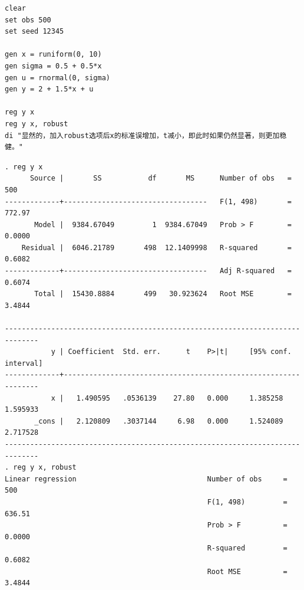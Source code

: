 \begin{tcolorbox}[title=在 Stata 中解决异方差问题, colback=white, colframe=black, colbacktitle=white, coltitle=black,fonttitle=\bfseries]
	\begin{lstlisting}[xleftmargin=2em,
		basicstyle=\ttfamily\small\color{black},
		keywordstyle=\color{black},
		commentstyle=\color{black},
		stringstyle=\color{black},
		identifierstyle=\color{black},
		numberstyle=\color{black},
		showstringspaces=false,
		morekeywords={clear, set, seed, net, install, mc_ols_sim, from, replace, use, collapse, list, twoway, histogram, kdensity, line, title, legend, yline, xline, aspectratio, plotregion, graphregion, save, color}]
clear
set obs 500
set seed 12345

gen x = runiform(0, 10)
gen sigma = 0.5 + 0.5*x
gen u = rnormal(0, sigma)
gen y = 2 + 1.5*x + u

reg y x
reg y x, robust
di "显然的，加入robust选项后x的标准误增加，t减小，即此时如果仍然显著，则更加稳健。"
	\end{lstlisting}
	\vspace{-1em}
	\begin{Verbatim}[commandchars=\\\{\},xleftmargin=2em]
. reg y x
      Source |       SS           df       MS      Number of obs   =       500
-------------+----------------------------------   F(1, 498)       =    772.97
       Model |  9384.67049         1  9384.67049   Prob > F        =    0.0000
    Residual |  6046.21789       498  12.1409998   R-squared       =    0.6082
-------------+----------------------------------   Adj R-squared   =    0.6074
       Total |  15430.8884       499   30.923624   Root MSE        =    3.4844

------------------------------------------------------------------------------
           y | Coefficient  Std. err.      t    P>|t|     [95% conf. interval]
-------------+----------------------------------------------------------------
           x |   1.490595   .0536139    27.80   0.000     1.385258    1.595933
       _cons |   2.120809   .3037144     6.98   0.000     1.524089    2.717528
------------------------------------------------------------------------------
. reg y x, robust
Linear regression                               Number of obs     =        500
                                                F(1, 498)         =     636.51
                                                Prob > F          =     0.0000
                                                R-squared         =     0.6082
                                                Root MSE          =     3.4844


\end{Verbatim}
\end{tcolorbox}

